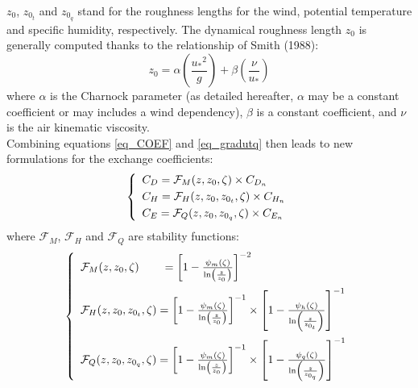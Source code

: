 $z_0$, $z_{0_t}$ and $z_{0_q}$ stand for the roughness lengths for the wind, potential temperature and specific humidity, respectively.
The dynamical roughness length $z_0$ is generally computed thanks to the relationship of Smith (1988): \nocite{smith1988}
\begin{equation}
	z_{0}=\alpha \left(\frac{{u_*}^{2}}{g}\right) + \beta \left(\frac{\nu}{u_{*}}\right)
\label{z0_smith}
\end{equation}
where $\alpha$ is the Charnock \nocite{Charnock1955} parameter (as detailed hereafter, $\alpha$ may be a constant coefficient 
or may includes a wind dependency), $\beta$ is a constant coefficient, and $\nu$ is the air kinematic viscosity.\\

Combining equations \ref{eq_COEF} and \ref{eq_gradutq} then leads to new formulations for the exchange coefficients:
\begin{equation}
\left\{
\begin{array}{l}
\vspace*{0.1 cm}
	C_D=\mathcal{F}_{M}(z,z_0,\zeta) \times C_{D_n}\\
\vspace*{0.1 cm}
	C_H=\mathcal{F}_{H}(z,z_0,z_{0_t},\zeta) \times C_{H_n}\\
	C_E=\mathcal{F}_{Q}(z,z_0,z_{0_q},\zeta) \times C_{E_n}\\
\end{array}
\right.
\end{equation}
where $\mathcal{F}_{M}$, $\mathcal{F}_{H}$ and $\mathcal{F}_{Q}$ are stability functions:
\begin{equation}
\left\{
\begin{array}{l}
\vspace*{0.2 cm}
	\mathcal{F}_{M}(z,z_0,\zeta)~~~~~~={\left[1-\frac{{\psi}_m(\zeta)}{\ln\left(\frac{z}{z_0}\right)}\right]}^{-2}\\
\vspace*{0.2 cm}
	\mathcal{F}_{H}(z,z_0,z_{0_t},\zeta)={\left[1-\frac{{\psi}_m(\zeta)}{\ln\left(\frac{z}{z_0}\right)}\right]}^{-1} \times {\left[1-\frac{{\psi}_h(\zeta)}{\ln\left(\frac{z}{z_{0_t}}\right)}\right]}^{-1}\\
	\mathcal{F}_{Q}(z,z_0,z_{0_q},\zeta)={\left[1-\frac{{\psi}_m(\zeta)}{\ln\left(\frac{z}{z_0}\right)}\right]}^{-1} \times {\left[1-\frac{{\psi}_q(\zeta)}{\ln\left(\frac{z}{z_{0_q}}\right)}\right]}^{-1}\\
\end{array}
\right.
\end{equation}
